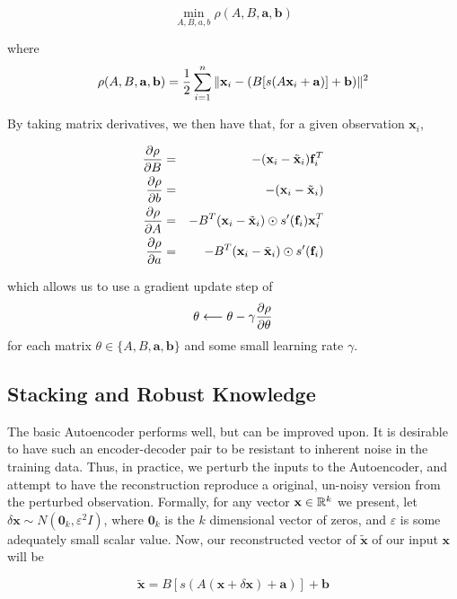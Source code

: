 \begin{equation}
\min_{A,B,a,b} \rho(A,B,\mathbf{a},\mathbf{b})
\end{equation}

where 
\begin{equation}
\label{eqrho}
\rho(A,B,\mathbf{a},\mathbf{b}) = \frac{1}{2}\sum_{i = 1}^{n} \Vert \mathbf{x}_i -  (B [s(A\mathbf{x}_i + \mathbf{a})]+\mathbf{b}) \Vert ^ 2
\end{equation}

By taking matrix derivatives, we then have that, for a given observation $\mathbf{x}_i$,

\begin{eqnarray}
\label{grads_of_auto}
\frac{\partial \rho}{\partial B}&=& -(\mathbf{x}_i -\tilde{\mathbf{x}}_i) \mathbf{f}_i^T \\ 
\frac{\partial \rho}{\partial b}&=& -(\mathbf{x}_i - \tilde{\mathbf{x}}_i) \\
\frac{\partial \rho}{\partial A}&=& -B^T(\mathbf{x}_i -\tilde{\mathbf{x}}_i) \odot s'(\mathbf{f}_i)\mathbf{x}_i^T \\
\frac{\partial \rho}{\partial a}&=& -B^T(\mathbf{x}_i -\tilde{\mathbf{x}}_i) \odot s'(\mathbf{f}_i)
\end{eqnarray}

which allows us to use a gradient update step of
\begin{equation}
\label{eq:1layerupdate}
\theta \longleftarrow \theta - \gamma \frac{\partial \rho}{\partial \theta}
\end{equation}
for each matrix $\theta\in\{A, B, \mathbf{a}, \mathbf{b}\}$ and some small learning rate $\gamma$.

\subsection{Stacking and Robust Knowledge}
The basic Autoencoder performs well, but can be improved upon. It is desirable to have such an encoder-decoder pair to be resistant to inherent noise in the training data. Thus, in practice, we perturb the inputs to the Autoencoder, and attempt to have the reconstruction reproduce a original, un-noisy version from the perturbed observation. Formally, for any vector $\textbf{x}\in\mathbb{R}^{k}$ we present, let $\delta\mathbf{x}\sim N(\mathbf{0}_k, \varepsilon^2 I)$, where $\mathbf{0}_k$ is the $k$ dimensional vector of zeros, and $\varepsilon$ is some adequately small scalar value. Now, our reconstructed vector of $\tilde{\mathbf{x}}$ of our input $\mathbf{x}$ will be 

\begin{equation}
\label{denoising}
\tilde{\mathbf{x}} = B[s(A(\mathbf{x} + \delta\mathbf{x}) + \mathbf{a})] + \mathbf{b}
\end{equation}

